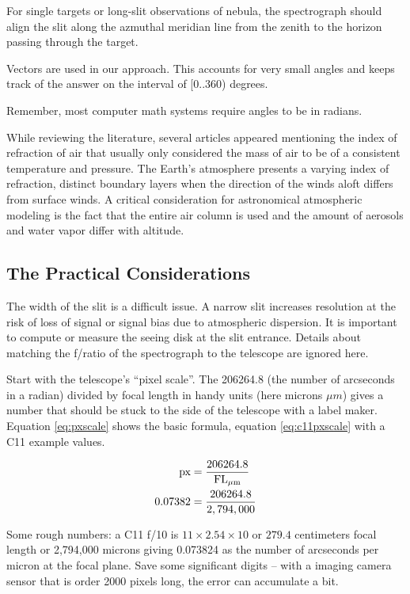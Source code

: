 \documentclass[letter,11pt,oneside]{article}
\begin{document}
For single targets or long-slit observations of nebula, the
spectrograph should align the slit along the azmuthal meridian line
from the zenith to the horizon passing through the target.

Vectors are used in our approach. This accounts for very small
angles and keeps track of the answer on the interval of [0..360) 
degrees.

Remember, most computer math systems require angles to be in radians.

While reviewing the literature, several articles appeared mentioning
the index of refraction of air that usually only considered the
mass of air to be of a consistent temperature and pressure. The
Earth's atmosphere presents a varying index of refraction, distinct
boundary layers when the direction of the winds aloft differs from
surface winds. A critical consideration for astronomical atmospheric
modeling is the fact that the entire air column is used and the
amount of aerosols and water vapor differ with altitude.

\subsection{The Practical Considerations}

The width of the slit is a difficult issue. A narrow slit increases
resolution at the risk of loss of signal or signal bias due to
atmospheric dispersion. It is important to compute or measure
the seeing disk at the slit entrance. Details about matching
the f/ratio of the spectrograph to the telescope are ignored here.

Start with the telescope's ``pixel scale''. The 206264.8 (the number of
arcseconds in a radian) divided by focal length in handy units (here microns
$\mu{m}$) gives a number that should be stuck to the side of the telescope
with a label maker. Equation \ref{eq:pxscale} shows the basic formula,
equation \ref{eq:c11pxscale} with a C11 example values.


\begin{align}
\textrm{px} &= \frac{206264.8}{\rm{FL}_{\mu{m}}}  \label{eq:pxscale} \\
0.07382 &= \frac{206264.8}{2,794,000} \label{eq:c11pxscale}
\end{align}


Some rough numbers: a C11 f/10 is $11\times 2.54 \times 10$
or $279.4$ centimeters focal length or 2,794,000 microns giving 0.073824
as the number of arcseconds per micron at the focal plane. Save some
significant digits -- with a imaging camera sensor that is order 2000
pixels long, the error can accumulate a bit.
\end{document}
